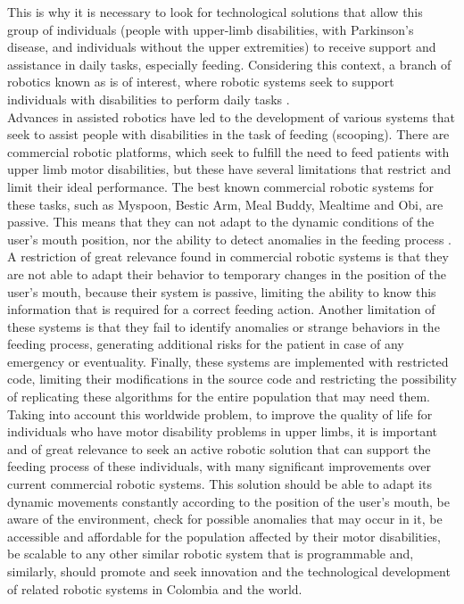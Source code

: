 \documentclass[11pt]{report} %
\begin{document}
This is why it is necessary to look for technological solutions that allow this group of individuals (people with upper-limb disabilities, with Parkinson's disease, and individuals without the upper extremities) to receive support and assistance in daily tasks, especially feeding. Considering this context, a branch of robotics known as  is of interest, where robotic systems seek to support individuals with disabilities to perform daily tasks \citep{cite_assited_robotics_stanford_lecture_jaffe}.\\

Advances in assisted robotics have led to the development of various systems that seek to assist people with disabilities in the task of feeding (scooping). There are commercial robotic platforms, which seek to fulfill the need to feed patients with upper limb motor disabilities, but these have several limitations that restrict and limit their ideal performance. The best known commercial robotic systems for these tasks, such as Myspoon, Bestic Arm, Meal Buddy, Mealtime and Obi, are passive. This means that they can not adapt to the dynamic conditions of the user's mouth position, nor the ability to detect anomalies in the feeding process \citep{cite_park_active_robot_assisted_feeding}.\\

A restriction of great relevance found in commercial robotic systems is that they are not able to adapt their behavior to temporary changes in the position of the user's mouth, because their system is passive, limiting the ability to know this information that is required for a correct feeding action. Another limitation of these systems is that they fail to identify anomalies or strange behaviors in the feeding process, generating additional risks for the patient in case of any emergency or eventuality. Finally, these systems are implemented with restricted code, limiting their modifications in the source code and restricting the possibility of replicating these algorithms for the entire population that may need them.\\

Taking into account this worldwide problem, to improve the quality of life for individuals who have motor disability problems in upper limbs, it is important and of great relevance to seek an active robotic solution that can support the feeding process of these individuals, with many significant improvements over current commercial robotic systems. This solution should be able to adapt its dynamic movements constantly according to the position of the user's mouth, be aware of the environment, check for possible anomalies that may occur in it, be accessible and affordable for the population affected by their motor disabilities, be scalable to any other similar robotic system that is programmable and, similarly, should promote and seek innovation and the technological development of related robotic systems in Colombia and the world.\\
\end{document}
